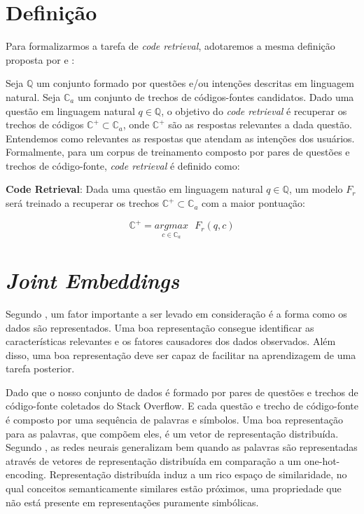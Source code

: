 \section{Definição}\label{sec:code-retrieval-definicao}


Para formalizarmos a tarefa de \textit{code retrieval}, adotaremos a mesma definição proposta por \cite{Allamanis-bimodal-source-code-natural-language:2015} e \cite{Yao-coacor:2019}:

Seja $\mathbb{Q}$ um conjunto formado por questões e/ou intenções descritas em linguagem natural. Seja $\mathbb{C}_{a}$ um conjunto de trechos de códigos-fontes candidatos. Dado uma questão em linguagem natural $q \in \mathbb{Q}$, o objetivo do \textit{code retrieval} é recuperar os trechos de códigos $\mathbb{C}^{+} \subset \mathbb{C}_{a}$, onde $\mathbb{C}^{+}$ são as respostas relevantes a dada questão. Entendemos como relevantes as respostas que atendam as intenções dos usuários. Formalmente, para um corpus de treinamento composto por pares de questões e trechos de código-fonte, \textit{code retrieval} é definido como:

\textbf{Code Retrieval}: Dada uma questão em linguagem natural $q \in \mathbb{Q}$, um modelo $F_{r}$ será treinado a recuperar os trechos $\mathbb{C}^{+} \subset \mathbb{C}_{a}$ com a maior pontuação:

\begin{equation}\label{eq:code-retrieval}
\mathbb{C}^{+} = \underset{c \in \mathbb{C}_{a}}{argmax}\text{ } F_{r}(q , c)
\end{equation}

\section{\textit{Joint Embeddings}}

Segundo \cite{Goodfellow-et-al-2016}, um fator importante a ser levado em consideração é a forma como os dados são representados. Uma boa representação consegue identificar as características relevantes e os fatores causadores dos dados observados. Além disso, uma boa representação deve ser capaz de facilitar na aprendizagem de uma tarefa posterior.

Dado que o nosso conjunto de dados é formado por pares de questões e trechos de código-fonte coletados do Stack Overflow. E cada questão e trecho de código-fonte é composto por uma sequência de palavras e símbolos.
Uma boa representação para as palavras, que compõem eles, é um vetor de representação distribuída. Segundo \cite{Goodfellow-et-al-2016}, as redes neurais generalizam bem quando as palavras são representadas através de vetores de representação distribuída em comparação a um \gls{one-hot-encoding}. Representação distribuída induz a um rico espaço de similaridade, no qual conceitos semanticamente similares estão próximos, uma propriedade que não está presente em representações puramente simbólicas.

